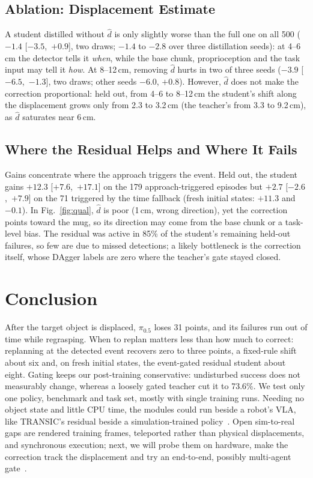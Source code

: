 \documentclass[conference,a4paper]{IEEEtran}
\begin{document}
\subsection{Ablation: Displacement Estimate}
A student distilled without $\hat d$ is only slightly worse than the full one on all 500 ($-1.4$ [$-3.5$,~$+0.9$], two draws; $-1.4$ to $-2.8$ over three distillation seeds): at 4--6\,cm the detector tells it \emph{when}, while the base chunk, proprioception and the task input may tell it \emph{how}. At 8--12\,cm, removing $\hat d$ hurts in two of three seeds ($-3.9$ [$-6.5$,~$-1.3$], two draws; other seeds $-6.0$, $+0.8$). However, $\hat d$ does not make the correction proportional: held out, from 4--6 to 8--12\,cm the student's shift along the displacement grows only from 2.3 to 3.2\,cm (the teacher's from 3.3 to 9.2\,cm), as $\hat d$ saturates near 6\,cm.

\subsection{Where the Residual Helps and Where It Fails}
Gains concentrate where the approach triggers the event. Held out, the student gains $+12.3$ [$+7.6$,~$+17.1$] on the 179 approach-triggered episodes but $+2.7$ [$-2.6$,~$+7.9$] on the 71 triggered by the time fallback (fresh initial states: $+11.3$ and $-0.1$). In Fig.~\ref{fig:qual}, $\hat d$ is poor (1\,cm, wrong direction), yet the correction points toward the mug, so its direction may come from the base chunk or a task-level bias. The residual was active in 85\% of the student's remaining held-out failures, so few are due to missed detections; a likely bottleneck is the correction itself, whose DAgger labels are zero where the teacher's gate stayed closed.


\section{Conclusion}

After the target object is displaced, $\pi_{0.5}$ loses 31 points, and its failures run out of time while regrasping. When to replan matters less than how much to correct: replanning at the detected event recovers zero to three points, a
fixed-rule shift about six and, on fresh initial states, the event-gated residual student about eight. Gating keeps our post-training conservative: undisturbed success does not measurably change, whereas a loosely gated teacher cut it to 73.6\%. We test only one policy, benchmark and task set, mostly with single training runs. Needing no object state and little CPU time, the modules could run beside a robot's VLA, like \mbox{TRANSIC}'s residual beside a simulation-trained policy~\cite{jiang2024transic}. Open sim-to-real gaps are rendered training frames, teleported rather than physical displacements, and synchronous execution; next, we will probe them on hardware, make the correction track the displacement and try an end-to-end, possibly multi-agent gate~\cite{shin2024mars}.



\end{document}
